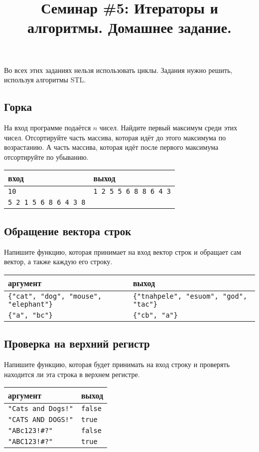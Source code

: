 \documentclass{article}
\begin{document}
\title{Семинар \#5: Итераторы и алгоритмы. Домашнее задание.\vspace{-5ex}}\date{}\maketitle
Во всех этих заданиях нельзя использовать циклы. Задания нужно решить, используя алгоритмы STL.
\subsection{Горка}
На вход программе подаётся $n$ чисел. Найдите первый максимум среди этих чисел. Отсортируйте часть массива, которая идёт до этого максимума по возрастанию. А часть массива, которая идёт после первого максимума отсортируйте по убыванию.
\begin{center}
\begin{tabular}{ l | l }
 вход & выход \\ \hline
 \texttt{10} & \texttt{1 2 5 5 6 8 8 6 4 3} \\
 \texttt{5 2 1 5 6 8 6 4 3 8} &
\end{tabular}
\end{center}


\subsection{Обращение вектора строк}
Напишите функцию, которая принимает на вход вектор строк и обращает сам вектор, а также каждую его строку.
\begin{center}
\begin{tabular}{ l | l }
 аргумент & выход \\ \hline
 \texttt{\{"cat"{}, "dog"{}, "mouse"{}, "elephant"\}} & \texttt{\{"tnahpele"{}, "esuom"{}, "god"{}, "tac"\}} \\
 \texttt{\{"a"{}, "bc"\}} & \texttt{\{"cb"{}, "a"\}} \\
\end{tabular}
\end{center}

\subsection{Проверка на верхний регистр}
Напишите функцию, которая будет принимать на вход строку и проверять находится ли эта строка в верхнем регистре.
\begin{center}
\begin{tabular}{ l | l }
 аргумент & выход \\ \hline
 \texttt{"Cats and Dogs!"} & \texttt{false} \\
 \texttt{"CATS AND DOGS!"} & \texttt{true} \\
 \texttt{"ABc123!\#?"} & \texttt{false} \\
 \texttt{"ABC123!\#?"} & \texttt{true}
\end{tabular}
\end{center}
\end{document}
